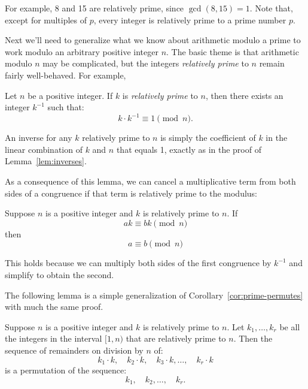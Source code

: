 For example, 8 and 15 are relatively prime, since $\gcd(8, 15) = 1$.
Note that, except for multiples of $p$, every integer is relatively
prime to a prime number $p$.

Next we'll need to generalize what we know about arithmetic modulo a
prime to work modulo an arbitrary positive integer $n$.  The basic
theme is that arithmetic modulo $n$ may be complicated, but the
integers \emph{relatively prime} to $n$ remain fairly well-behaved.
For example,
\begin{lemma}
\label{lem:inverse-arb}
Let $n$ be a positive integer.  If $k$ is \emph{relatively prime} to
$n$, then there exists an integer $k^{-1}$ such that:
\[
k \cdot k^{-1} \equiv 1 \pmod{n}.
\]
\end{lemma}
An inverse for any $k$ relatively prime to $n$ is simply the
coefficient of $k$ in the linear combination of $k$ and $n$ that
equals 1, exactly as in the proof of Lemma~\ref{lem:inverses}.

\iffalse
\begin{proof}
There exist integers $s$ and $t$ such that $s k + t n = \gcd(k, n) =
1$ by Theorem~\ref{th:gcd}.  Rearranging terms gives $tn = 1 - sk$,
which implies that $n \divides 1 - sk$ and $sk \equiv 1 \pmod{n}$.  Define
$k^{-1}$ to be $s$.
\end{proof}
\fi

As a consequence of this lemma, we can cancel a multiplicative term
from both sides of a congruence if that term is relatively prime to
the modulus:
\begin{corollary}
\label{cor:cancellation-arb}
Suppose $n$ is a positive integer and $k$ is relatively prime to $n$.
If
%
\[
a k \equiv b k \pmod{n}
\]
%
then
%
\[
a \equiv b \pmod{n}
\]
\end{corollary}

This holds because we can multiply both sides of the first congruence
by $k^{-1}$ and simplify to obtain the second.

The following lemma is a simple generalization of
Corollary~\ref{cor:prime-permutes} with much the same proof.
\begin{lemma}
\label{lem:permutes-arb}
Suppose $n$ is a positive integer and $k$ is relatively prime to $n$.
Let $k_1, \dots, k_r$ be all the integers in the interval
$[1,n)$ that are relatively prime to $n$.  Then the sequence of
  remainders on division by $n$ of:
%
\[
k_1 \cdot k,\quad
k_2 \cdot k,\quad
k_3 \cdot k, \dots,\quad
k_r \cdot k
\]
is a permutation of the sequence:
\[
k_1,\quad k_2, \dots,\quad k_r.
\]
\end{lemma}

